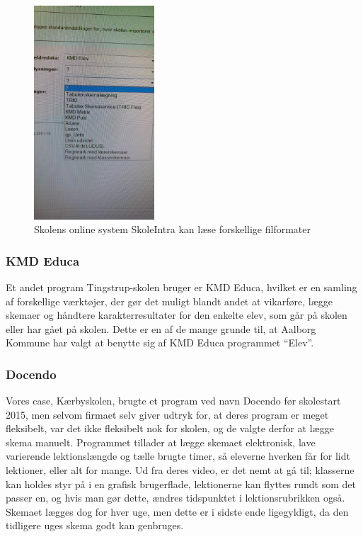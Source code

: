 \begin{figure}[h!]
	\centering
	\includegraphics[width=0.4\textwidth]{../Billeder/Skemaimportering_filtyper_Intra.jpg}
	\caption{Skolens online system SkoleIntra kan læse forskellige filformater}
	\label{fig:kompatibleFiltyper}
\end{figure}
\FloatBarrier
\subsubsection{KMD Educa}
Et andet program Tingstrup-skolen bruger er KMD Educa, hvilket er en samling af forskellige værktøjer\cite{KMD}, der gør det muligt blandt andet at vikarføre, lægge skemaer og håndtere karakterresultater for den enkelte elev, som går på skolen eller har gået på skolen. Dette er en af de mange grunde til, at Aalborg Kommune har valgt at benytte sig af KMD Educa programmet ``Elev''\cite{useCase_KMD_Educa_Elev}.

\subsubsection{Docendo}
Vores case, Kærbyskolen, brugte et program ved navn Docendo før skolestart 2015, men selvom firmaet selv giver udtryk for, at deres program er meget fleksibelt\cite{Docendo}, var det ikke fleksibelt nok for skolen, og de valgte derfor at lægge skema manuelt. Programmet tillader at lægge skemaet elektronisk, lave varierende lektionslængde og tælle brugte timer, så eleverne hverken får for lidt lektioner, eller alt for mange. Ud fra deres video\cite{Docendo_video}, er det nemt at gå til; klasserne kan holdes styr på i en grafisk brugerflade, lektionerne kan flyttes rundt som det passer en, og hvis man gør dette, ændres tidspunktet i lektionsrubrikken også. Skemaet lægges dog for hver uge, men dette er i sidste ende ligegyldigt, da den tidligere uges skema godt kan genbruges.

